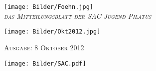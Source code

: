   \begin{titlepage}


	\begin{minipage}[c]{\textwidth}
		\begin{center}
			\texttt{[image: Bilder/Foehn.jpg]}\\
			\medskip
			\textsc{\textit{das Mitteilungsblatt der SAC-Jugend Pilatus} }\\[0.5cm]
		\end{center}
	\end{minipage}

\bigskip
\bigskip
\bigskip
\bigskip
\bigskip

	\begin{minipage}[c]{\textwidth}
		\begin{center}%
 			\texttt{[image: Bilder/Okt2012.jpg]}%
 		\end{center}
	\end{minipage}

\bigskip
\bigskip
\bigskip
\bigskip
\bigskip
	\begin{minipage}[c]{\textwidth}
		\begin{center}
		\textsc{Ausgabe: 8 Oktober 2012} \\[10cm]
		\end{center}
	\end{minipage}

\vspace{1cm}
\begin{minipage}[c]{\textwidth}
\begin{center}
	\texttt{[image: Bilder/SAC.pdf]}%
\end{center}
\end{minipage}

\end{titlepage}